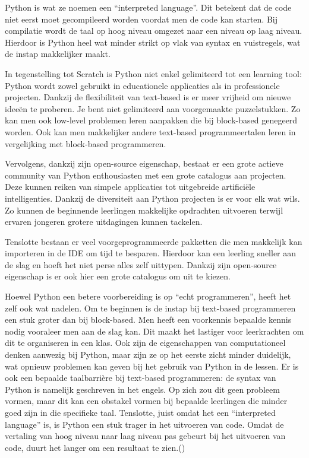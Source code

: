 Python is wat ze noemen een “interpreted language”. Dit betekent dat de code niet eerst moet gecompileerd worden voordat men de code kan starten. Bij compilatie wordt de taal op hoog niveau omgezet naar een niveau op laag niveau. Hierdoor is Python heel wat minder strikt op vlak van syntax en vuistregels, wat de instap makkelijker maakt. \cite{Karani2020}

In tegenstelling tot Scratch is Python niet enkel gelimiteerd tot een learning tool: Python wordt zowel gebruikt in educationele applicaties als in professionele projecten. Dankzij de flexibiliteit van text-based is er meer vrijheid om nieuwe ideeën te proberen. Je bent niet gelimiteerd aan voorgemaakte puzzelstukken. Zo kan men ook low-level problemen leren aanpakken die bij block-based genegeerd worden. Ook kan men makkelijker andere text-based programmeertalen leren in vergelijking met block-based programmeren.

Vervolgens, dankzij zijn open-source eigenschap, bestaat er een grote actieve community van Python enthousiasten met een grote catalogus aan projecten. Deze kunnen reiken van simpele applicaties tot uitgebreide artificiële intelligenties. Dankzij de diversiteit aan Python projecten is er voor elk wat wils. Zo kunnen de beginnende leerlingen makkelijke opdrachten uitvoeren terwijl ervaren jongeren grotere uitdagingen kunnen tackelen. 

Tenslotte bestaan er veel voorgeprogrammeerde pakketten die men makkelijk kan importeren in de IDE om tijd te besparen. Hierdoor kan een leerling sneller aan de slag en hoeft het niet perse alles zelf uittypen. Dankzij zijn open-source eigenschap is er ook hier een grote catalogus om uit te kiezen.

Hoewel Python een betere voorbereiding is op “echt programmeren”, heeft het zelf ook wat nadelen. Om te beginnen is de instap bij text-based programmeren een stuk groter dan bij block-based. Men heeft een voorkennis bepaalde kennis nodig vooraleer men aan de slag kan. Dit maakt het lastiger voor leerkrachten om dit te organiseren in een klas. Ook zijn de eigenschappen van computationeel denken aanwezig bij Python, maar zijn ze op het eerste zicht minder duidelijk, wat opnieuw problemen kan geven bij het gebruik van Python in de lessen.
Er is ook een bepaalde taalbarrière bij text-based programmeren: de syntax van Python is namelijk geschreven in het engels. Op zich zou dit geen probleem vormen, maar dit kan een obstakel vormen bij bepaalde leerlingen die minder goed zijn in die specifieke taal.
Tenslotte, juist omdat het een “interpreted language” is,  is Python een stuk trager in het uitvoeren van code. Omdat de vertaling van hoog niveau naar laag niveau pas gebeurt bij het uitvoeren van code, duurt het langer om een resultaat te zien.(\cite{Armoni2015})

